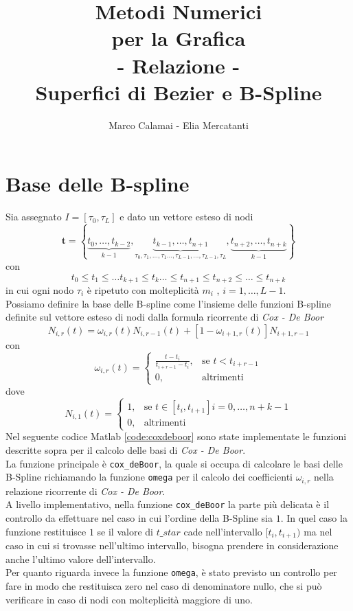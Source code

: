 \documentclass[a4paper, 12pt]{article}
\title{\textbf{\Huge Metodi Numerici\\ per la Grafica\\ \vspace{1cm}- Relazione -\\ \vspace{1cm} Superfici di Bezier e B-Spline}}
\author{Marco Calamai - Elia Mercatanti}
\begin{document}
	
\begin{titlepage}
	\maketitle
\end{titlepage}

\tableofcontents
\lstlistoflistings
\listoffigures

\newpage

\section{Base delle B-spline}

Sia assegnato $I = [\tau_0, \tau_L]$ e dato un vettore esteso di nodi
$$ \mathbf{t} =  \left\{ \underbrace{t_{0}, \dots, t_{k-2}}_{k-1}, \underbrace{t_{k-1}, \dots, t_{n+1}}_{\tau_0, \tau_1, \dots, \tau_1 \dots, \tau_{L-1}, \dots, \tau_{L-1} ,\tau_L}, \underbrace{t_{n+2}, \dots, t_{n+k}}_{k-1} \right\} $$
con
$$t_0 \leq t_1 \leq \dots t_{k+1} \leq  t_k \dots \leq  t_{n+1} \leq t_{n+2} \leq \dots \leq t_{n+k}$$
in cui ogni nodo $\tau_i$ è ripetuto con molteplicità $m_i$ , $i = 1, \dots , L-1$.\\
Possiamo definire la base delle B-spline come l'insieme delle funzioni B-spline definite sul vettore esteso di nodi dalla formula ricorrente di \textit{Cox - De Boor}
$$N_{i, r}(t) = \omega_{i,r}(t)N_{i, r-1}(t) + [1-\omega_{i+1, r}(t)]N_{i+1, r-1}$$
con
$$\omega_{i,r}(t) = \begin{cases} \frac{t-t_i}{t_{i+r-1}-t_i}, & \text{se } t<t_{i+r-1} \\ 0, & \text{altrimenti} \end{cases}$$
dove
$$N_{i, 1}(t) = \begin{cases} 1, & \text{se } t\in[t_i, t_{i+1}] i = 0, \dots, n+k-1 \\ 0, & \text{altrimenti} \end{cases}$$
Nel seguente codice Matlab \ref{code:coxdeboor}  sono state implementate le funzioni descritte sopra per il calcolo delle basi di \textit{Cox - De Boor}.\\
La funzione principale è \texttt{cox\_deBoor}, la quale si occupa di calcolare le basi delle B-Spline richiamando la funzione \texttt{omega} per il calcolo dei coefficienti $\omega_{i,r}$ nella relazione ricorrente di \textit{Cox - De Boor}.\\
A livello implementativo, nella funzione \texttt{cox\_deBoor} la parte più delicata è il controllo da effettuare nel caso in cui l'ordine della B-Spline sia $1$. In quel caso la funzione restituisce $1$ se il valore di $t\_star$ cade nell'intervallo $[t_i, t_{i+1}) $ ma nel caso in cui si trovasse nell'ultimo intervallo, bisogna prendere in considerazione anche l'ultimo valore dell'intervallo.\\
Per quanto riguarda invece la funzione \texttt{omega}, è stato previsto un controllo per fare in modo che restituisca zero nel caso di denominatore nullo, che si può verificare in caso di nodi con molteplicità maggiore di uno.
\end{document}
